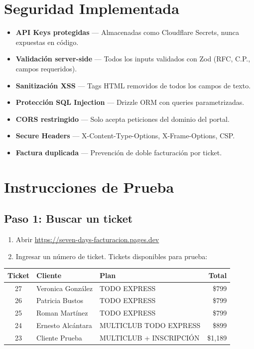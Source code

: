 \documentclass[11pt,a4paper]{article}
\begin{document}
\section*{Seguridad Implementada}

\begin{itemize}[leftmargin=1.5cm]
  \item \textbf{API Keys protegidas} --- Almacenadas como Cloudflare Secrets, nunca expuestas en código.
  \item \textbf{Validación server-side} --- Todos los inputs validados con Zod (RFC, C.P., campos requeridos).
  \item \textbf{Sanitización XSS} --- Tags HTML removidos de todos los campos de texto.
  \item \textbf{Protección SQL Injection} --- Drizzle ORM con queries parametrizadas.
  \item \textbf{CORS restringido} --- Solo acepta peticiones del dominio del portal.
  \item \textbf{Secure Headers} --- X-Content-Type-Options, X-Frame-Options, CSP.
  \item \textbf{Factura duplicada} --- Prevención de doble facturación por ticket.
\end{itemize}

\section*{Instrucciones de Prueba}

\subsection*{Paso 1: Buscar un ticket}

\begin{enumerate}[leftmargin=1.5cm]
  \item Abrir \url{https://seven-days-facturacion.pages.dev}
  \item Ingresar un número de ticket. Tickets disponibles para prueba:
\end{enumerate}

\begin{center}
\begin{tabularx}{0.85\textwidth}{clXr}
  \textbf{Ticket} & \textbf{Cliente} & \textbf{Plan} & \textbf{Total} \\
  \hline
  27 & Veronica González & TODO EXPRESS & \$799 \\
  26 & Patricia Bustos & TODO EXPRESS & \$799 \\
  25 & Roman Martínez & TODO EXPRESS & \$799 \\
  24 & Ernesto Alcántara & MULTICLUB TODO EXPRESS & \$899 \\
  23 & Cliente Prueba & MULTICLUB + INSCRIPCIÓN & \$1,189 \\
\end{tabularx}
\end{center}
\end{document}
